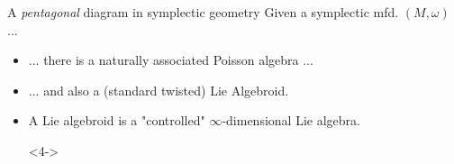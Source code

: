\documentclass[10pt]{beamer}
\begin{document}
\begin{frame}[fragile]{A \emph{pentagonal} diagram in symplectic geometry}
	Given a \alert{symplectic mfd.} $(M,\omega)$ ...
	\vfill
	\begin{center}
		
	\end{center}
	\vspace{3em}
	\vfill
	\begin{minipage}[t][8.5em][t]{\textwidth}
		\begin{itemize}
			\item<1-> \alert<1>{... there is a naturally associated Poisson algebra ...}
			\item<2-> \alert<2>{... and also a (standard twisted) Lie Algebroid}.
			\item<3-> A Lie algebroid is a "controlled" \alert<3>{$\infty$-dimensional Lie algebra.}
			\item[]<4->
				\quad\\
		\vspace{-.75em}
		\begin{tcolorbox}[enhanced,frame hidden,borderline={0.5pt}{0pt}{blue}]
		\end{tcolorbox}
		\end{itemize}
	\end{minipage}
\end{frame}
\end{document}
